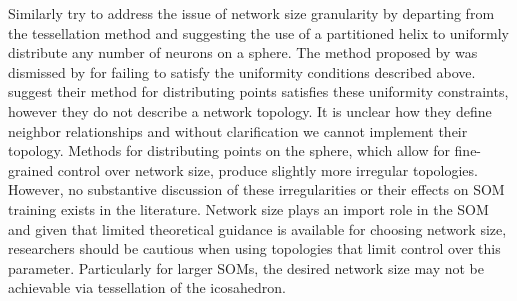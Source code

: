 Similarly \cite{Nishio:2006fk} try to address the issue of network size
granularity by departing from the tessellation method and suggesting the use
of a partitioned helix to uniformly distribute any number of neurons on a
sphere.  The method proposed by \cite{Rakhmanov94} was dismissed by
\cite{wu2005} for failing to satisfy the uniformity conditions described
above. \cite{Nishio:2006fk} suggest their method for distributing points
satisfies these uniformity constraints, however they do not describe a network
topology.  It is unclear how they define neighbor relationships and without
clarification we cannot implement their topology.  Methods for distributing
points on the sphere, which allow for fine-grained control over network size,
produce slightly more irregular topologies.  However, no substantive
discussion of these irregularities or their effects on SOM training exists in
the literature. Network size plays an import role in the SOM and given
that limited theoretical guidance is available for choosing network size,
researchers should be cautious when using topologies that limit control over
this parameter.  Particularly for larger SOMs, the desired network size may
not be achievable via tessellation of the icosahedron.

